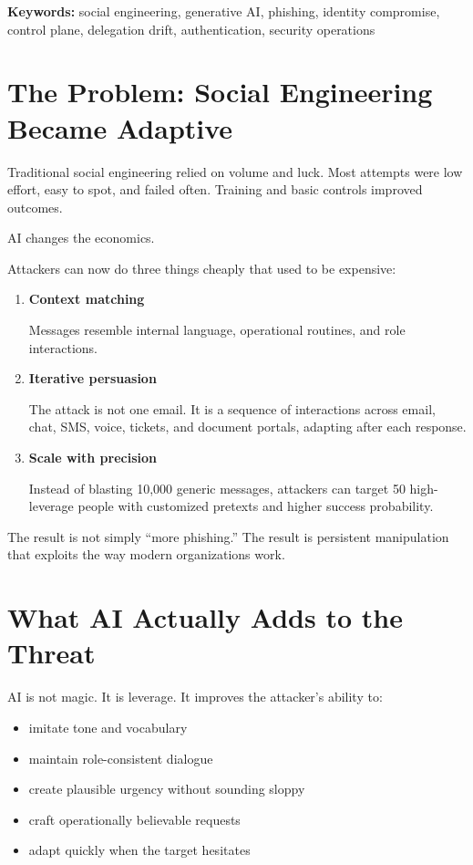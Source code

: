 \documentclass[11pt]{article}
\begin{document}
\noindent\textbf{Keywords:} social engineering, generative AI, phishing, identity compromise, control plane, delegation drift, authentication, security operations

\section{The Problem: Social Engineering Became Adaptive}

Traditional social engineering relied on volume and luck. Most attempts were low effort, easy to spot, and failed often. Training and basic controls improved outcomes.

AI changes the economics.

Attackers can now do three things cheaply that used to be expensive:

\begin{enumerate}[leftmargin=1.5em]
    \item \textbf{Context matching}

    Messages resemble internal language, operational routines, and role interactions.

    \item \textbf{Iterative persuasion}

    The attack is not one email. It is a sequence of interactions across email, chat, SMS, voice, tickets, and document portals, adapting after each response.

    \item \textbf{Scale with precision}

    Instead of blasting 10,000 generic messages, attackers can target 50 high-leverage people with customized pretexts and higher success probability.
\end{enumerate}

The result is not simply ``more phishing.'' The result is persistent manipulation that exploits the way modern organizations work.

\section{What AI Actually Adds to the Threat}

AI is not magic. It is leverage. It improves the attacker’s ability to:

\begin{itemize}[leftmargin=1.5em]
    \item imitate tone and vocabulary
    \item maintain role-consistent dialogue
    \item create plausible urgency without sounding sloppy
    \item craft operationally believable requests
    \item adapt quickly when the target hesitates
\end{itemize}
\end{document}
